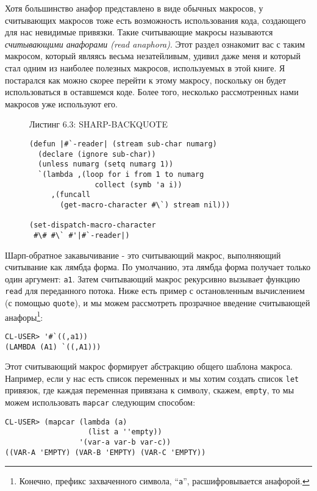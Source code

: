 Хотя большинство анафор представлено в виде обычных макросов, у считывающих макросов тоже есть возможность использования кода, создающего для нас невидимые привязки. Такие считывающие макросы называются \emph{считывающими анафорами (read anaphora)}. Этот раздел ознакомит вас с таким макросом, который являясь весьма незатейливым, удивил даже меня и который стал одним из наиболее полезных макросов, используемых в этой книге. Я постарался как можно скорее перейти к этому макросу, поскольку он будет использоваться в оставшемся коде. Более того, несколько рассмотренных нами макросов уже используют его.

\begin{figure}Листинг 6.3: SHARP-BACKQUOTE\label{listing_6.3}
\listbegin
\begin{verbatim}
(defun |#`-reader| (stream sub-char numarg)
  (declare (ignore sub-char))
  (unless numarg (setq numarg 1))
  `(lambda ,(loop for i from 1 to numarg
               collect (symb 'a i))
     ,(funcall
       (get-macro-character #\`) stream nil)))

(set-dispatch-macro-character
 #\# #\` #'|#`-reader|)
\end{verbatim}
\listend
\end{figure}

Шарп-обратное закавычивание - это считывающий макрос, выполняющий считывание как лямбда форма. По умолчанию, эта лямбда форма получает только один аргумент: \verb"a1". Затем считывающий макрос рекурсивно вызывает функцию \verb"read" для переданного потока. Ниже есть пример с остановленным вычислением (с помощью \verb"quote"), и мы можем рассмотреть прозрачное введение считывающей анафоры\footnote{Конечно, префикс захваченного символа, ``\verb"a"'', расшифровывается анафорой.}:



\begin{verbatim}
CL-USER> '#`((,a1))
(LAMBDA (A1) `((,A1)))
\end{verbatim}

Этот считывающий макрос формирует абстракцию общего шаблона макроса. Например, если у нас есть список переменных и мы хотим создать список \verb"let" привязок, где каждая переменная привязана к символу, скажем, \verb"empty", то мы можем использовать \verb"mapcar" следующим способом:

\begin{verbatim}
CL-USER> (mapcar (lambda (a)
                   (list a ''empty))
                 '(var-a var-b var-c))
((VAR-A 'EMPTY) (VAR-B 'EMPTY) (VAR-C 'EMPTY))
\end{verbatim}

